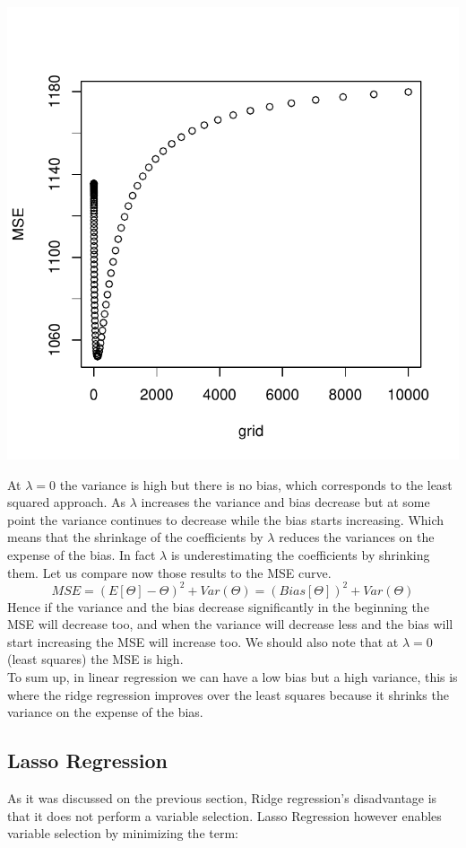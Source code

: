 \documentclass[]{report}
\begin{document}
\begin{center}
	\includegraphics[width=0.8\linewidth]{Figures/ridge_mse.pdf}
\end{center}

At $\lambda=0$ the variance is high but there is no bias, which corresponds to the least squared approach.
As $\lambda$ increases the variance and bias decrease but at some point the variance continues to decrease while the bias starts increasing. Which means that the shrinkage of the coefficients by $\lambda$ reduces the variances on the expense of the bias. In fact $\lambda$ is underestimating the coefficients by shrinking them. Let us compare now those results to the MSE curve. 
$$MSE = (E[\varTheta]-\varTheta)^{2} + Var(\varTheta) = (Bias[\varTheta])^{2} + Var(\varTheta)$$
Hence if the variance and the bias decrease significantly in the beginning the MSE will decrease too, and when the variance will decrease less and the bias will start increasing the MSE will increase too. We should also note that at  $\lambda=0$ (least squares) the MSE is high.\\
To sum up, in linear regression we can have a low bias but a high variance, this is where the ridge regression improves over the least squares because it shrinks the variance on the expense of the bias.

\subsection{Lasso Regression}
As it was discussed on the previous section, Ridge regression's disadvantage is that it does not perform a variable selection. Lasso Regression however enables variable selection by minimizing the term:
\end{document}
